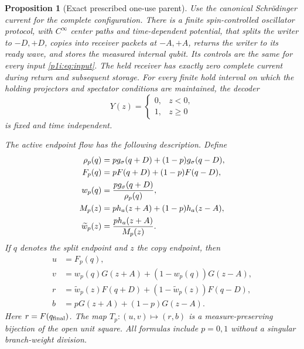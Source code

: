 \documentclass[11pt]{article}
\numberwithin{equation}{section}
\newtheorem{proposition}[theorem]{Proposition}
\theoremstyle{definition}
\theoremstyle{remark}
\begin{document}
\begin{proposition}[Exact prescribed one-use parent]\label{p1i:prop:parent}
Use the canonical Schr\"odinger current for the complete configuration.
There is a finite spin-controlled oscillator protocol, with $C^\infty$ center
paths and time-dependent potential, that splits
the writer to $-D,+D$, copies into receiver packets at $-A,+A$, returns the
writer to its ready wave, and stores the measured internal qubit. Its
controls are the same for every input \eqref{p1i:eq:input}. The held receiver
has exactly zero complete current during return and subsequent storage.
For every finite hold interval on which the holding projectors and
spectator conditions are maintained, the decoder
\begin{equation}\label{p1i:eq:decoder}
 Y(z)=\begin{cases}0,&z<0,\\1,&z\geq0\end{cases}
\end{equation}
is fixed and time independent.

The active endpoint flow has the following description. Define
\begin{align}
 \rho_p(q)&=p g_\sigma(q+D)+(1-p)g_\sigma(q-D),\notag\\
 F_p(q)&=pF(q+D)+(1-p)F(q-D),\notag\\
 w_p(q)&=\frac{p g_\sigma(q+D)}{\rho_p(q)},\notag\\
 M_p(z)&=p h_a(z+A)+(1-p)h_a(z-A),\notag\\
 \widetilde w_p(z)&=\frac{p h_a(z+A)}{M_p(z)}.\label{p1i:eq:mixtures}
\end{align}
If $q$ denotes the split endpoint and $z$ the copy endpoint, then
\begin{align}
 u&=F_p(q),\label{p1i:eq:flow1}\\
 v&=w_p(q)G(z+A)+(1-w_p(q))G(z-A),\label{p1i:eq:flow2}\\
 r&=\widetilde w_p(z)F(q+D)+(1-\widetilde w_p(z))F(q-D),
 \label{p1i:eq:flow3}\\
 b&=pG(z+A)+(1-p)G(z-A).\label{p1i:eq:flow4}
\end{align}
Here $r=F(q_{\rm final})$. The map $T_p:(u,v)\mapsto(r,b)$ is a
measure-preserving bijection of the open unit square. All formulas include
$p=0,1$ without a singular branch-weight division.
\end{proposition}
\end{document}
